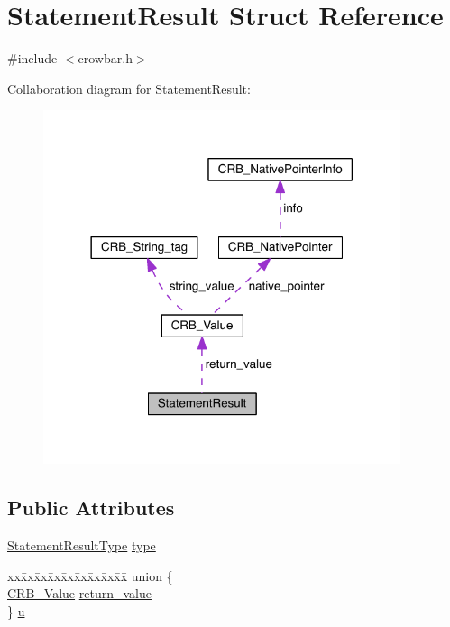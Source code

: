 \hypertarget{struct_statement_result}{}\section{Statement\+Result Struct Reference}
\label{struct_statement_result}


{\ttfamily \#include $<$crowbar.\+h$>$}



Collaboration diagram for Statement\+Result\+:\nopagebreak
\begin{figure}[H]
\begin{center}
\leavevmode
\includegraphics[width=297pt]{struct_statement_result__coll__graph}
\end{center}
\end{figure}
\subsection*{Public Attributes}
\begin{DoxyCompactItemize}
\item 
\hyperlink{crowbar_8h_afba1fe14e53276aeab17faf3818e77c1}{Statement\+Result\+Type} \hyperlink{struct_statement_result_a1c65be71416a40eea23153d5af3f7d19}{type}
\item 
\begin{tabbing}
xx\=xx\=xx\=xx\=xx\=xx\=xx\=xx\=xx\=\kill
union \{\\
\>\hyperlink{struct_c_r_b___value}{CRB\_Value} \hyperlink{struct_statement_result_a83ca729f73987f1358be29ca21c2349e}{return\_value}\\
\} \hyperlink{struct_statement_result_a3922b8f85edf104dbe464831804f9816}{u}\\

\end{tabbing}\end{DoxyCompactItemize}


